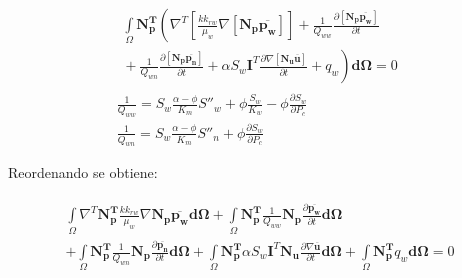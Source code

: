 \begin{ceqn} 
\begin{subequations} \label{eq:equ366} 
\begin{gather}
\begin{multlined}
\int\limits_\Omega \mathbf{N_{p}^T}\left( \nabla^T \left[\frac{k k_{rw}}{\mu_{w}}\nabla [\mathbf{N_p}\mathbf{\overline{p_w}}] \right] + \frac{1}{Q_{ww}}\frac{\partial [\mathbf{N_p}\mathbf{\overline{p_w}}]}{\partial t} \right. \\[12pt]
\left. {} + \frac{1}{Q_{wn}}\frac{\partial [\mathbf{N_p}\mathbf{\overline{p_n}}]}{\partial t} +\alpha S_w\mathbf{I}^T\frac{\partial \nabla [\mathbf{N_u}\mathbf{\overline{u}}]}{\partial t} + q_w\right) \mathbf{d\Omega} = 0 \end{multlined}\label{eq:equ366a}\\[12pt]
\frac{1}{Q_{ww}} = S_w \frac{\alpha - \phi}{K_m}S''_w + \phi\frac{S_w}{K_w} - \phi\frac{\partial S_w}{\partial P_c} \label{eq:equ66b}\\[12pt]
\frac{1}{Q_{wn}} = S_w \frac{\alpha - \phi}{K_m}S''_n + \phi\frac{\partial S_w}{\partial P_c} \label{eq:equ66c}
\end{gather}  
\end{subequations} 
\end{ceqn}

\bigskip
Reordenando se obtiene:

\begin{ceqn} 
\begin{gather} \label{eq:equ367} 
\begin{multlined}
\int\limits_\Omega \nabla^T\mathbf{N_{p}^T} \frac{k k_{rw}}{\mu_{w}}\nabla \mathbf{N_p}\mathbf{\overline{p_w}} \mathbf{d\Omega}  + \int\limits_\Omega \mathbf{N_{p}^T}\frac{1}{Q_{ww}}\mathbf{N_p}\frac{\partial \mathbf{\overline{p_w}}}{\partial t}\mathbf{d\Omega}\\[12pt] 
+ \int\limits_\Omega \mathbf{N_{p}^T}\frac{1}{Q_{wn}}\mathbf{N_p}\frac{\partial \mathbf{\overline{p_n}}}{\partial t}\mathbf{d\Omega} + \int\limits_\Omega \mathbf{N_{p}^T}\alpha S_w\mathbf{I}^T\mathbf{N_u}\frac{\partial \nabla \mathbf{\overline{u}}}{\partial t}\mathbf{d\Omega} + \int\limits_\Omega \mathbf{N_{p}^T}q_w \mathbf{d\Omega} = 0
\end{multlined}
\end{gather} 
\end{ceqn}

